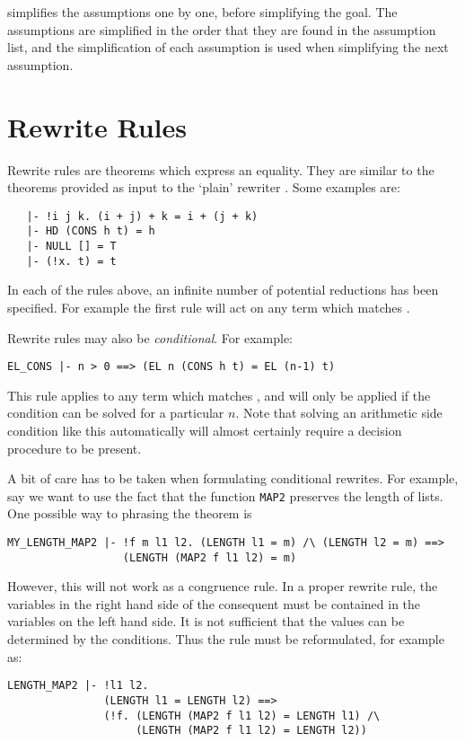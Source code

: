 \documentclass[a4]{article}
\begin{document}
 simplifies the assumptions one by one, before
simplifying the goal.  The assumptions are simplified in the order
that they are found in the assumption list, and the simplification
of each assumption is used when simplifying the next assumption.

\section{Rewrite Rules}

\label{rewrite-rules}

Rewrite rules are theorems which express an equality.  They
are similar to the theorems
provided as input to the `plain' rewriter
.  Some examples are:
\begin{hol}\begin{verbatim}
   |- !i j k. (i + j) + k = i + (j + k)
   |- HD (CONS h t) = h
   |- NULL [] = T
   |- (!x. t) = t
\end{verbatim}\end{hol}
In each of the rules above, an infinite number of potential
reductions has been specified.  For example the first rule
will act on any term which matches .

Rewrite rules may also be {\em conditional}.  For example:
\begin{hol}\begin{verbatim}
EL_CONS |- n > 0 ==> (EL n (CONS h t) = EL (n-1) t)
\end{verbatim}\end{hol}
This
rule applies to any term which matches ,
and will only be applied if the condition  can be
solved for a particular $n$.  Note that solving an arithmetic side condition
like this automatically will almost certainly
require a decision procedure to be present.

A bit of care has to be taken when formulating conditional rewrites.
For example, say we want to use the fact that the function {\tt MAP2}
preserves the length of lists. One possible way to phrasing the
theorem is
\begin{hol} \begin{verbatim}
MY_LENGTH_MAP2 |- !f m l1 l2. (LENGTH l1 = m) /\ (LENGTH l2 = m) ==>
                  (LENGTH (MAP2 f l1 l2) = m)
\end{verbatim} \end{hol}

However, this will not work as a congruence rule. In a proper rewrite
rule, the variables in the right hand side of the consequent must be
contained in the variables on the left hand side. It is not sufficient
that the values can be determined by the conditions. Thus the rule
must be reformulated, for example as:
\begin{hol} \begin{verbatim}
LENGTH_MAP2 |- !l1 l2.
               (LENGTH l1 = LENGTH l2) ==>
               (!f. (LENGTH (MAP2 f l1 l2) = LENGTH l1) /\
                    (LENGTH (MAP2 f l1 l2) = LENGTH l2))
\end{verbatim} \end{hol}
\end{document}

